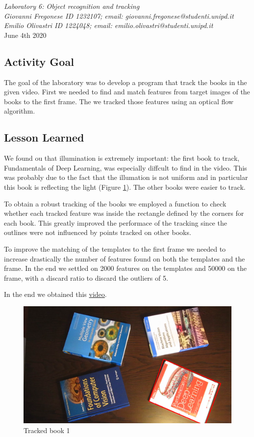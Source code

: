 \documentclass[a4paper,11pt]{article}
\makeatletter
\newcommand{\expT}{Object recognition and tracking}
\newcommand{\cand}{Giovanni Fregonese ID 1232107; email: giovanni.fregonese@studenti.unipd.it \\
                   Emilio Olivastri ID 1224048; email: emilio.olivastri@studenti.unipd.it}
\newcommand{\dateD}{June 4th 2020}
\makeatother
\begin{document}
\begin{center}
	\Large
	\begin{center}
		\textsl{Laboratory 6: \expT}\\
		\large
		\hfill\break
		\textsl{\cand}\\
		\dateD
	\end{center}
\end{center}

\subsection*{Activity Goal}

The goal of the laboratory was to develop a program that track the books in the given video.
First we needed to find and match features from target images of the books to the first frame.
The we tracked those features using an optical flow algorithm. 


\subsection*{Lesson Learned}

We found ou that illumination is extremely important: the first book to track, Fundamentals of Deep Learning, was especially diffcult to find in the video.
This was probably due to the fact that the illumation is not uniform and in particular this book is reflecting the light (Figure \ref{fig:book1}). 
The other books were easier to track.

To obtain a robust tracking of the books we employed a function to check whether each tracked feature was inside the rectangle defined by the corners for each book.
This greatly improved the performace of the tracking since the outlines were not influenced by points tracked on other books.

To improve the matching of the templates to the first frame we needed to increase drastically the number of features found on both the templates and the frame.
In the end we settled on 2000 features on the templates and 50000 on the frame, with a discard ratio to discard the outliers of 5.

In the end we obtained this \href{https://youtu.be/u_683hzvI8o}{video}.


\begin{figure}[ht]
    \centering
    \includegraphics[width=\textwidth]{imgs/TrackedFeatures0.png}
    \caption{Tracked book 1}
    \label{fig:book1}
\end{figure}
\end{document}
